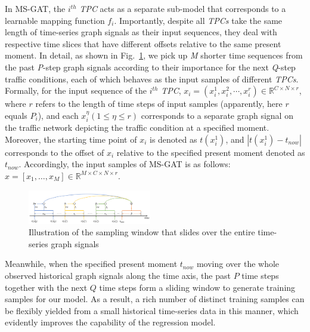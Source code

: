 In MS-GAT, the $i^{th}$ \textit{TPC} acts as a separate sub-model that corresponds to a learnable mapping function $f_i$. Importantly, despite all \textit{TPCs} take the same length of time-series graph signals as their input sequences, they deal with respective time slices that have different offsets relative to the same present moment. In detail, as shown in Fig.~\ref{fig:sampling}, we pick up \textit{M} shorter time sequences from the past \textit{P}-step graph signals according to their importance for the next \textit{Q}-step traffic conditions, each of which behaves as the input samples of different \textit{TPCs}. Formally, for the input sequence of the $i^{th}$ \textit{TPC}, $x_i=(x_i^1, x_i^2, \cdots ,x_i^r) \in \mathbb{R}^{C \times N \times r}$, where $r$ refers to the length of time steps of input samples (apparently, here $r$ equals  $P_i$), and each $x_i^\eta (1 \leq \eta \leq r)$ corresponds to a separate graph signal on the traffic network depicting the traffic condition at a specified moment. Moreover, the starting time point of $x_i$ is denoted as $t(x_i^1)$, and $|t(x_i^1) - t_{now}|$ corresponds to the offset of $x_i$ relative to the specified present moment denoted as $t_{now}$. Accordingly, the input samples of MS-GAT is as follows: $x = [x_1, \dots , x_M] \in \mathbb{R}^{M \times C \times N \times r}$.

\begin{figure}[!ht]
    \centering
    \includegraphics[width=0.48\textwidth]{pictures/Sampling.png}
    \caption{Illustration of the sampling window that slides over the entire time-series graph signals}
    \label{fig:sampling}
\end{figure}

Meanwhile, when the specified present moment $t_{now}$ moving over the whole observed historical graph signals along the time axis, the past $P$ time steps together with the next  $Q$ time steps form a sliding window to generate training samples for our model. As a result, a rich number of distinct training samples can be flexibly yielded from a small historical time-series data in this manner, which evidently improves the capability of the regression model.

